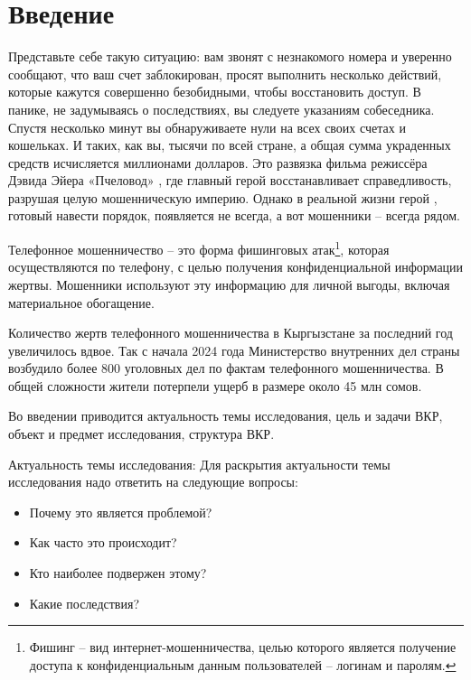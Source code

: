 \section*{\centering Введение}

Представьте себе такую ситуацию: вам звонят с незнакомого номера и уверенно сообщают, что ваш счет заблокирован, просят выполнить несколько действий, которые кажутся совершенно безобидными, чтобы восстановить доступ. В панике, не задумываясь о последствиях, вы следуете указаниям собеседника. Спустя несколько минут вы обнаруживаете нули на всех своих счетах и кошельках. И таких, как вы, тысячи по всей стране, а общая сумма украденных средств исчисляется миллионами долларов. Это развязка фильма режиссёра Дэвида Эйера «Пчеловод» \cite{beekeeper2024}, где главный герой восстанавливает справедливость, разрушая целую мошенническую империю. Однако в реальной жизни герой \cite{fraud2024}, готовый навести порядок, появляется не всегда, а вот мошенники – всегда рядом.

Телефонное мошенничество – это форма фишинговых атак\footnote{Фишинг –  вид интернет-мошенничества, целью которого является получение доступа к конфиденциальным данным пользователей – логинам и паролям.}, которая осуществляются по телефону, с целью получения конфиденциальной информации жертвы. Мошенники используют эту информацию для личной выгоды, включая материальное обогащение.

Количество жертв телефонного мошенничества в Кыргызстане за последний год увеличилось вдвое. Так с начала 2024 года Министерство внутренних дел страны возбудило более 800 уголовных дел по фактам телефонного мошенничества. В общей сложности жители потерпели ущерб в размере около 45 млн сомов.

Во введении приводится актуальность темы исследования, цель и задачи ВКР, объект и предмет исследования, структура ВКР.

Актуальность темы исследования:
Для раскрытия актуальности темы исследования надо ответить на следующие вопросы:
\begin{itemize}
	\item Почему это является проблемой?
	\item Как часто это происходит?
	\item Кто наиболее подвержен этому?
	\item Какие последствия?
\end{itemize}

\newpage
